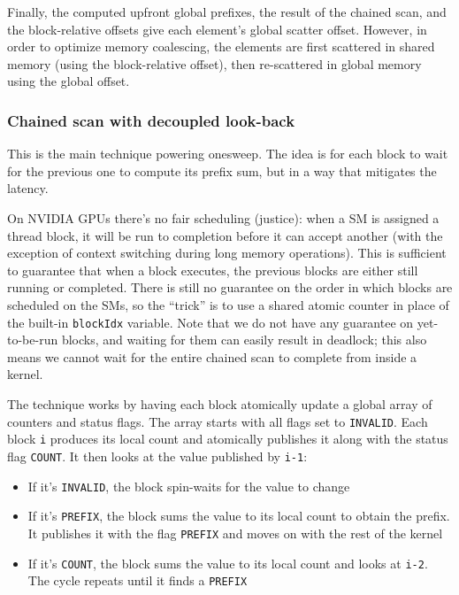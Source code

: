 \documentclass[a4paper]{report}
\newcommand{\ones}{onesweep\xspace}
\begin{document}
Finally, the computed upfront global prefixes, the result of the chained scan, and the block-relative offsets give each element's global scatter offset. However, in order to optimize memory coalescing, the elements are first scattered in shared memory (using the block-relative offset), then re-scattered in global memory using the global offset.

\subsubsection{Chained scan with decoupled look-back}

This is the main technique powering \ones. The idea is for each block to wait for the previous one to compute its prefix sum, but in a way that mitigates the latency.

On NVIDIA GPUs there's no fair scheduling (justice): when a SM is assigned a thread block, it will be run to completion before it can accept another (with the exception of context switching during long memory operations). This is sufficient to guarantee that when a block executes, the previous blocks are either still running or completed. There is still no guarantee on the order in which blocks are scheduled on the SMs, so the ``trick'' is to use a shared atomic counter in place of the built-in \lstinline{blockIdx} variable. Note that we do not have any guarantee on yet-to-be-run blocks, and waiting for them can easily result in deadlock; this also means we cannot wait for the entire chained scan to complete from inside a kernel.

The technique works by having each block atomically update a global array of counters and status flags. The array starts with all flags set to \lstinline{INVALID}. Each block \lstinline{i} produces its local count and atomically publishes it along with the status flag \lstinline{COUNT}. It then looks at the value published by \lstinline{i-1}:

\begin{itemize}
  \item If it's \lstinline{INVALID}, the block spin-waits for the value to change
  \item If it's \lstinline{PREFIX}, the block sums the value to its local count to obtain the prefix. It publishes it with the flag \lstinline{PREFIX} and moves on with the rest of the kernel
  \item If it's \lstinline{COUNT}, the block sums the value to its local count and looks at \lstinline{i-2}. The cycle repeats until it finds a \lstinline{PREFIX}
\end{itemize}
\end{document}
